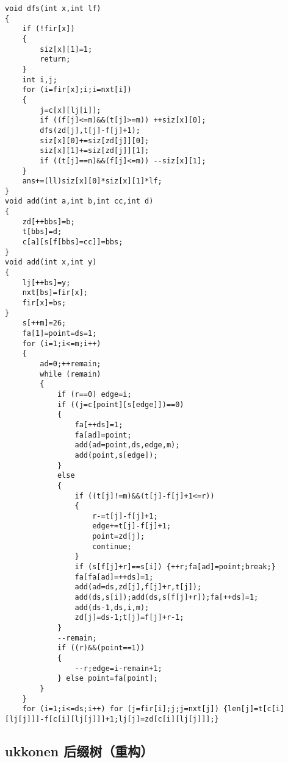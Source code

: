 \documentclass[12pt]{ctexart}
\begin{document}
\begin{lstlisting}
void dfs(int x,int lf)
{
	if (!fir[x])
	{
		siz[x][1]=1;
		return;
	}
	int i,j;
	for (i=fir[x];i;i=nxt[i])
	{
		j=c[x][lj[i]];
		if ((f[j]<=m)&&(t[j]>=m)) ++siz[x][0];
		dfs(zd[j],t[j]-f[j]+1);
		siz[x][0]+=siz[zd[j]][0];
		siz[x][1]+=siz[zd[j]][1];
		if ((t[j]==n)&&(f[j]<=m)) --siz[x][1];
	}
	ans+=(ll)siz[x][0]*siz[x][1]*lf;
}
void add(int a,int b,int cc,int d)
{
	zd[++bbs]=b;
	t[bbs]=d;
	c[a][s[f[bbs]=cc]]=bbs;
}
void add(int x,int y)
{
	lj[++bs]=y;
	nxt[bs]=fir[x];
	fir[x]=bs;
}
	s[++m]=26;
	fa[1]=point=ds=1;
	for (i=1;i<=m;i++)
	{
		ad=0;++remain;
		while (remain)
		{
			if (r==0) edge=i;
			if ((j=c[point][s[edge]])==0)
			{
				fa[++ds]=1;
				fa[ad]=point;
				add(ad=point,ds,edge,m);
				add(point,s[edge]);
			}
			else
			{
				if ((t[j]!=m)&&(t[j]-f[j]+1<=r))
				{
					r-=t[j]-f[j]+1;
					edge+=t[j]-f[j]+1;
					point=zd[j];
					continue;
				}
				if (s[f[j]+r]==s[i]) {++r;fa[ad]=point;break;}
				fa[fa[ad]=++ds]=1;
				add(ad=ds,zd[j],f[j]+r,t[j]);
				add(ds,s[i]);add(ds,s[f[j]+r]);fa[++ds]=1;
				add(ds-1,ds,i,m);
				zd[j]=ds-1;t[j]=f[j]+r-1;
			}
			--remain;
			if ((r)&&(point==1))
			{
				--r;edge=i-remain+1;
			} else point=fa[point];
		}
	}
	for (i=1;i<=ds;i++) for (j=fir[i];j;j=nxt[j]) {len[j]=t[c[i][lj[j]]]-f[c[i][lj[j]]]+1;lj[j]=zd[c[i][lj[j]]];}
\end{lstlisting}

\subsection{ukkonen 后缀树（重构）}
\end{document}
